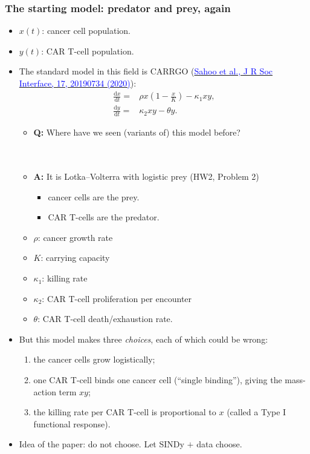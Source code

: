 \documentclass[20pt]{extarticle}
\newcommand{\hrefc}[2]{\href{#1}{\textcolor{blue}{#2}}}
\begin{document}
\subsubsection*{The starting model: predator and prey, again}

\begin{itemize}
\item $x(t)$: cancer cell population.
\item $y(t)$: CAR T-cell population.
\item The standard model in this field is CARRGO (\hrefc{https://doi.org/10.1098/rsif.2019.0734}{Sahoo et al., J R Soc Interface, 17, 20190734 (2020)}):
\[
\begin{aligned}
\frac{\text{d}x}{\text{d}t} =& \rho x \left( 1 - \frac{x}{K} \right) - \kappa_1 x y,\\
\frac{\text{d}y}{\text{d}t} =& \kappa_2 x y - \theta y.
\end{aligned}
\]
	\begin{itemize}
	\item \textbf{Q:} Where have we seen (variants of) this model before?
	\ \\
	\ \\
	\ \\
	\item \textbf{A:} It is Lotka--Volterra with logistic prey (HW2, Problem 2)
		\begin{itemize}
		\item cancer cells are the prey.
		\item CAR T-cells are the predator.
		\end{itemize}
	\item $\rho$: cancer growth rate
	\item $K$: carrying capacity
	\item $\kappa_1$: killing rate
	\item $\kappa_2$: CAR T-cell proliferation per encounter
	\item $\theta$: CAR T-cell death/exhaustion rate.
	\end{itemize}
\item But this model makes three \emph{choices}, each of which could be wrong:
	\begin{enumerate}
	\item the cancer cells grow logistically;
	\item one CAR T-cell binds one cancer cell (``single binding''), giving the mass-action term $xy$;
	\item the killing rate per CAR T-cell is proportional to $x$ (called a Type I functional response).
	\end{enumerate}
\item Idea of the paper: do not choose. Let SINDy $+$ data choose.
\end{itemize}
\end{document}
